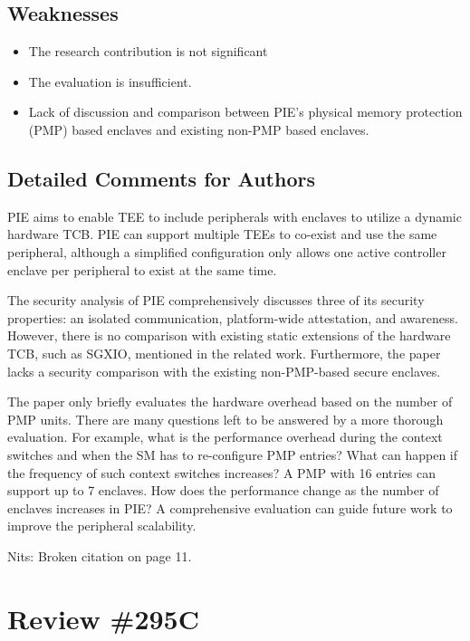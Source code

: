\documentclass[9pt]{article}
\begin{document}
\subsection{Weaknesses}

\begin{itemize}
\item
  The research contribution is not significant
\item
  The evaluation is insufficient.
\item
  Lack of discussion and comparison between PIE's physical memory
  protection (PMP) based enclaves and existing non-PMP based enclaves.
\end{itemize}

\subsection{Detailed Comments for Authors}

PIE aims to enable TEE to include peripherals with enclaves to utilize a
dynamic hardware TCB. PIE can support multiple TEEs to co-exist and use
the same peripheral, although a simplified configuration only allows one
active controller enclave per peripheral to exist at the same time.

The security analysis of PIE comprehensively discusses three of its
security properties: an isolated communication, platform-wide
attestation, and awareness. However, there is no comparison with
existing static extensions of the hardware TCB, such as SGXIO, mentioned
in the related work. Furthermore, the paper lacks a security comparison
with the existing non-PMP-based secure enclaves.

The paper only briefly evaluates the hardware overhead based on the
number of PMP units. There are many questions left to be answered by a
more thorough evaluation. For example, what is the performance overhead
during the context switches and when the SM has to re-configure PMP
entries? What can happen if the frequency of such context switches
increases? A PMP with 16 entries can support up to 7 enclaves. How does
the performance change as the number of enclaves increases in PIE? A
comprehensive evaluation can guide future work to improve the peripheral
scalability.

Nits: Broken citation on page 11.

\section{Review \#295C}
\end{document}

